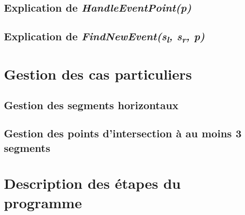 \documentclass[]{article}
\begin{document}
    \subsection{Explication de \emph{HandleEventPoint(p)}}\label{sub:eventPoint}
    
    \subsection{Explication de \emph{FindNewEvent(s\textsubscript{l}, s\textsubscript{r}, p)}}\label{sub:findNew}

\section{Gestion des cas particuliers}\label{sec:part}
    \subsection{Gestion des segments horizontaux}\label{sub:horiz}
    
    \subsection{Gestion des points d'intersection à au moins 3 segments}\label{sub:interSeg}

\section{Description des étapes du programme}\label{sec:prog}
\end{document}

